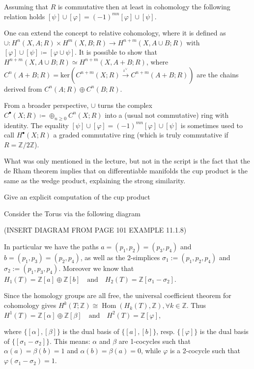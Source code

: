 Assuming that \( R \) is commutative then at least in cohomology the following relation holds
\( [\psi] \cup [\varphi] = (-1)^{mn}[\varphi] \cup [\psi] \).

One can extend the concept to relative cohomology, where it is defined as
\( \cup : H^n(X, A;R) \times H^m(X, B;R) \to H^{n+m}(X, A \cup B;R) \) with \( [\varphi] \cup [\psi] \coloneqq [\varphi \cup \psi] \).
It is possible to show that \(H^{n+m}(X, A \cup B;R) \simeq H^{n+m}(X, A + B;R) \), where \( C^n(A+B;R) = \text{ker}(C^{n+m}(X;R) \xrightarrow{\iota^\vee} C^{n+m}(A+B;R)) \) 
are the chains derived from \( C^n(A;R) \oplus C^n(B;R) \).

From a broader perspective, \( \cup \) turns the complex \( C^\bullet(X;R) \coloneqq \oplus_{n \geq 0} C^n(X;R) \) into a (usual not commutative) ring with identity.
The equality \( [\psi] \cup [\varphi] = (-1)^{mn}[\varphi] \cup [\psi] \) is sometimes used to call \( H^\bullet(X;R) \) a graded commutative ring 
(which is truly commutative if \( R = \mathbb{Z}/2\mathbb{Z} \)).

What was only mentioned in the lecture, but not in the script is the fact that the de Rham theorem implies that on differentiable manifolds
the cup product is the same as the wedge product, explaining the strong similarity. 


Give an explicit computation of the cup product 

Consider the Torus via the following diagram

(INSERT DIAGRAM FROM PAGE 101 EXAMPLE 11.1.8)

In particular we have the paths \(a = (p_1, p_2) = (p_3, p_4)\) and \(b = (p_1, p_3) = (p_2, p_4)\), 
as well as the 2-simplices \(\sigma_1 := (p_1, p_2, p_4)\) and \(\sigma_2 := (p_1, p_3, p_4)\). 
Moreover we know that 
\(
H_1(T) = \mathbb{Z} [a] \oplus \mathbb{Z} [b] \quad \text{and} \quad H_2(T) = \mathbb{Z} [\sigma_1 - \sigma_2].
\)

Since the homology groups are all free, the universal coefficient theorem for cohomology gives \(H^k(T; \mathbb{Z}) \cong \operatorname{Hom}(H_k(T), \mathbb{Z}), \forall k \in \mathbb{Z}\). 
Thus
\(
H^1(T) = \mathbb{Z} [\alpha] \oplus \mathbb{Z} [\beta] \quad \text{and} \quad H^2(T) = \mathbb{Z}[\varphi],
\)

where \(\{[\alpha], [\beta]\}\) is the dual basis of \(\{[a], [b]\}\), resp. \(\{[\varphi]\}\) is the dual basis of \(\{[\sigma_1 - \sigma_2]\}\). 
This means: \(\alpha\) and \(\beta\) are 1-cocycles such that \(\alpha(a) = \beta(b) = 1\) and \(\alpha(b) = \beta(a) = 0\), while \(\varphi\) is a 2-cocycle such that 
\(\varphi(\sigma_1 - \sigma_2) = 1\).

